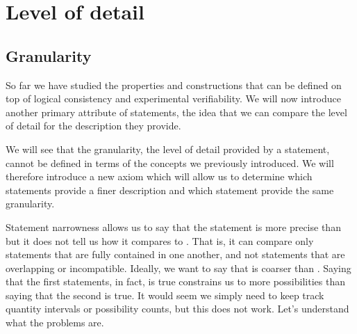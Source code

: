 \documentclass[11pt,letterpaper,fleqn]{memoir} %
\begin{document}
\iffalse

\chapter{Level of detail}

\section{Granularity}

So far we have studied the properties and constructions that can be defined on top of logical consistency and experimental verifiability. We will now  introduce another primary attribute of statements, the idea that we can compare the level of detail for the description they provide.

We will see that the granularity, the level of detail provided by a statement, cannot be defined in terms of the concepts we previously introduced. We will therefore introduce a new axiom which will allow us to determine which statements provide a finer description and which statement provide the same granularity.

Statement narrowness allows us to say that the statement  is more precise than  but it does not tell us how it compares to . That is, it can compare only statements that are fully contained in one another, and not statements that are overlapping or incompatible. Ideally, we want to say that  is coarser than . Saying that the first statements, in fact, is true constrains us to more possibilities than saying that the second is true. It would seem we simply need to keep track quantity intervals or possibility counts, but this does not work. Let's understand what the problems are.
\end{document}
